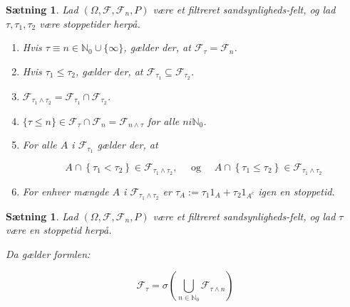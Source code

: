 \documentclass{article}
\newcommand{\1}{\mathbbm{1}}
\theoremstyle{boxed}
\newtheorem{proposition}[theorem]{Sætning}
\begin{document}
\begin{theorem-box}
    \begin{proposition}
        Lad $\left(\Omega, \mathcal{F}, \mathcal{F}_n, P\right)$ være et filtreret sandsynligheds-felt, og lad $\tau, \tau_1, \tau_2$ være stoppetider herpå.
\begin{enumerate}
    \item[\textnormal{(i)}] Hvis $\tau \equiv n \in \mathbb{N}_0 \cup\{\infty\}$, gælder der, at $\mathcal{F}_\tau=\mathcal{F}_n$.
    \item[\textnormal{(ii)}]Hvis $\tau_1 \leq \tau_2$, gælder der, at $\mathcal{F}_{\tau_1} \subseteq \mathcal{F}_{\tau_2}$.
    \item[\textnormal{(iii)}] $\mathcal{F}_{\tau_1 \wedge \tau_2}=\mathcal{F}_{\tau_1} \cap \mathcal{F}_{\tau_2}$.
    \item[\textnormal{(iv)}]  $\{\tau \leq n\} \in \mathcal{F}_\tau \cap \mathcal{F}_n=\mathcal{F}_{n \wedge \tau}$ for alle $n i \mathbb{N}_0$.
    \item[\textnormal{(v)}] For alle $A$ i $\mathcal{F}_{\tau_1}$ gælder der, at

    $$
    A \cap\left\{\tau_1<\tau_2\right\} \in \mathcal{F}_{\tau_1 \wedge \tau_2}, \quad \text { og } \quad A \cap\left\{\tau_1 \leq \tau_2\right\} \in \mathcal{F}_{\tau_1 \wedge \tau_2}
    $$
    \item[\textnormal{(vi)}] For enhver mængde $A$ i $\mathcal{F}_{\tau_1 \wedge \tau_2}$ er $\tau_A:=\tau_1 1_A+\tau_2 1_{A^c}$ igen en stoppetid.
\end{enumerate}
    \end{proposition}
\end{theorem-box}
\begin{theorem-box}
    \begin{proposition}
        Lad $\left(\Omega, \mathcal{F}, \mathcal{F}_n, P\right)$ være et filtreret sandsynligheds-felt, og lad $\tau$ være en stoppetid herpå.

Da gælder formlen:

$$
\mathcal{F}_\tau=\sigma\left(\bigcup_{n \in \mathbb{N}_0} \mathcal{F}_{\tau \wedge n}\right)
$$

    \end{proposition}
\end{theorem-box}
\end{document}
